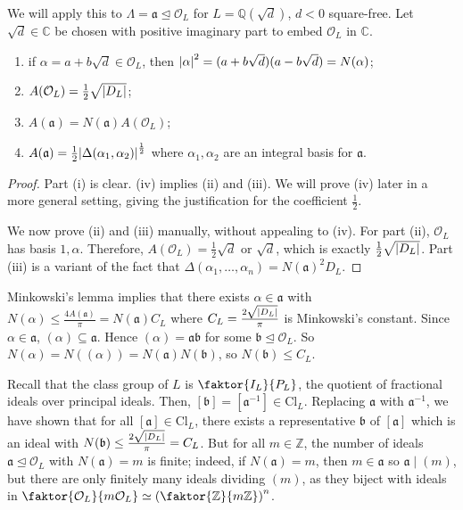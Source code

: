We will apply this to \( \Lambda = \mathfrak a \trianglelefteq \mathcal O_L \) for \( L = \mathbb Q(\sqrt{d}) \), \( d < 0 \) square-free.
Let \( \sqrt{d} \in \mathbb C \) be chosen with positive imaginary part to embed \( \mathcal O_L \) in \( \mathbb C \).
\begin{lemma}
    \begin{enumerate}
        \item if \( \alpha = a + b \sqrt{d} \in \mathcal O_L \), then \( \abs{\alpha}^2 = (a+b\sqrt{d})(a-b\sqrt{d}) = N(\alpha) \);
        \item \( A(\mathcal O_L) = \frac{1}{2}\sqrt{\abs{D_L}} \);
        \item \( A(\mathfrak a) = N(\mathfrak a) A(\mathcal O_L) \);
        \item \( A(\mathfrak a) = \frac{1}{2} \abs{\Delta(\alpha_1, \alpha_2)}^{\frac{1}{2}} \) where \( \alpha_1, \alpha_2 \) are an integral basis for \( \mathfrak a \).
    \end{enumerate}
\end{lemma}
\begin{proof}
    Part (i) is clear.
    (iv) implies (ii) and (iii).
    We will prove (iv) later in a more general setting, giving the justification for the coefficient \( \frac{1}{2} \).

    We now prove (ii) and (iii) manually, without appealing to (iv).
    For part (ii), \( \mathcal O_L \) has basis \( 1, \alpha \).
    Therefore, \( A(\mathcal O_L) = \frac{1}{2}\sqrt{d} \) or \( \sqrt{d} \), which is exactly \( \frac{1}{2} \sqrt{\abs{D_L}} \).
    Part (iii) is a variant of the fact that \( \Delta(\alpha_1, \dots, \alpha_n) = N(\mathfrak a)^2 D_L \).
\end{proof}
Minkowski's lemma implies that there exists \( \alpha \in \mathfrak a \) with \( N(\alpha) \leq \frac{4A(\mathfrak a)}{\pi} = N(\mathfrak a) C_L \) where \( C_L = \frac{2\sqrt{\abs{D_L}}}{\pi} \) is Minkowski's constant.
Since \( \alpha \in \mathfrak a \), \( (\alpha) \subseteq \mathfrak a \).
Hence \( (\alpha) = \mathfrak a \mathfrak b \) for some \( \mathfrak b \trianglelefteq \mathcal O_L \).
So \( N(\alpha) = N((\alpha)) = N(\mathfrak a) N(\mathfrak b) \), so \( N(\mathfrak b) \leq C_L \).

Recall that the class group of \( L \) is \( \faktor{I_L}{P_L} \), the quotient of fractional ideals over principal ideals.
Then, \( [\mathfrak b] = [\mathfrak a^{-1}] \in \mathrm{Cl}_L \).
Replacing \( \mathfrak a \) with \( \mathfrak a^{-1} \), we have shown that for all \( [\mathfrak a] \in \mathrm{Cl}_L \), there exists a representative \( \mathfrak b \) of \( [\mathfrak a] \) which is an ideal with \( N(\mathfrak b) \leq \frac{2\sqrt{\abs{D_L}}}{\pi} = C_L \).
But for all \( m \in \mathbb Z \), the number of ideals \( \mathfrak a \trianglelefteq \mathcal O_L \) with \( N(\mathfrak a) = m \) is finite; indeed, if \( N(\mathfrak a) = m \), then \( m \in \mathfrak a \) so \( \mathfrak a \mid (m) \), but there are only finitely many ideals dividing \( (m) \), as they biject with ideals in \( \faktor{\mathcal O_L}{m\mathcal O_L} \simeq \qty(\faktor{\mathbb Z}{m\mathbb Z})^n \).

